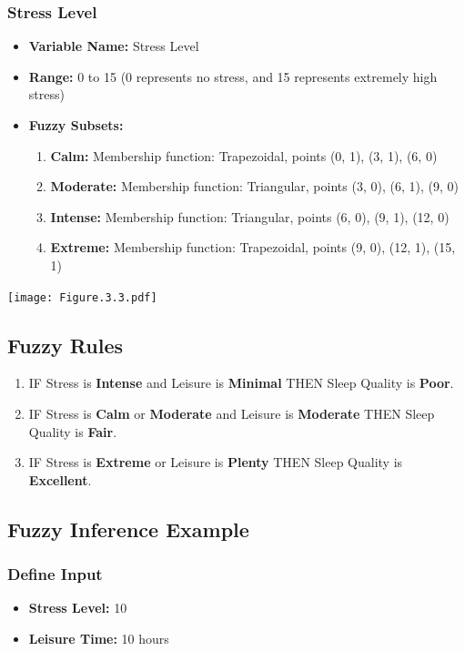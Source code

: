 \documentclass[12pt, a4paper]{article}
\begin{document}
\subsubsection*{Stress Level}
\begin{itemize}
    \item \textbf{Variable Name:} Stress Level
    \item \textbf{Range:} 0 to 15 (0 represents no stress, and 15 represents extremely high stress)
    \item \textbf{Fuzzy Subsets:}
    \begin{enumerate}
        \item \textbf{Calm:} Membership function: Trapezoidal, points (0, 1), (3, 1), (6, 0)
        \item \textbf{Moderate:} Membership function: Triangular, points (3, 0), (6, 1), (9, 0)
        \item \textbf{Intense:} Membership function: Triangular, points (6, 0), (9, 1), (12, 0)
        \item \textbf{Extreme:} Membership function: Trapezoidal, points (9, 0), (12, 1), (15, 1)
    \end{enumerate}
\end{itemize}
\texttt{[image: Figure.3.3.pdf]}

\subsection*{Fuzzy Rules}
\begin{enumerate}
    \item IF Stress is \textbf{Intense} and Leisure is \textbf{Minimal} THEN Sleep Quality is \textbf{Poor}.
    \item IF Stress is \textbf{Calm} or \textbf{Moderate} and Leisure is \textbf{Moderate} THEN Sleep Quality is \textbf{Fair}.
    \item IF Stress is \textbf{Extreme} or Leisure is \textbf{Plenty} THEN Sleep Quality is \textbf{Excellent}.
\end{enumerate}

\subsection*{Fuzzy Inference Example}
\subsubsection*{Define Input}
\begin{itemize}
    \item \textbf{Stress Level:} 10
    \item \textbf{Leisure Time:} 10 hours
\end{itemize}
\end{document}

